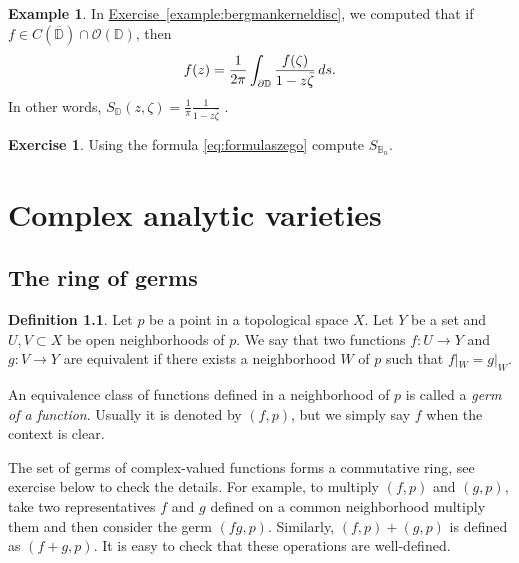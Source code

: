 \documentclass[12pt,openany]{book}
\newcommand{\avoidbreak}{\postdisplaypenalty=100}
\newcommand{\D}{{\mathbb{D}}}
\newcommand{\bB}{{\mathbb{B}}}
\newcommand{\sO}{{\mathscr{O}}}
\newcommand{\myindex}[1]{#1\index{#1}}
\theoremstyle{plain}
\theoremstyle{remark}
\theoremstyle{definition}
\newtheorem{defn}[thm]{Definition}
\newenvironment{exbox}{%
    \def\FrameCommand{\vrule width 1pt \relax\hspace{10pt}}%
    \MakeFramed {\advance \hsize -\width \FrameRestore}%
}{%
    \endMakeFramed
}
\theoremstyle{exercise}
\newtheorem{exercise}{Exercise}[section]
\theoremstyle{example}
\newtheorem{example}[thm]{Example}
\newcommand{\exerciseref}[1]{\hyperref[#1]{Exercise~\ref*{#1}}}
\begin{document}
\begin{example}
In \exerciseref{example:bergmankerneldisc}, we computed that
if $f \in C(\overline{\D}) \cap \sO(\D)$, then
\begin{equation*}
f(z) = \frac{1}{2\pi} \int_{\partial \D} \frac{f(\zeta)}{1-z\bar{\zeta}} \, ds .
\avoidbreak
\end{equation*}
In other words, $S_{\D}(z,\zeta) = 
\frac{1}{\pi}
\frac{1}{1-z\bar{\zeta}}$ .
\end{example}

\begin{exbox}
\begin{exercise}
Using the formula \eqref{eq:formulaszego} compute $S_{\bB_n}$.
\end{exercise}
\end{exbox}


\chapter{Complex analytic varieties} \label{ch:analyticvarieties}


\section{The ring of germs}

\begin{defn}
Let $p$ be a point in a topological space $X$.  Let $Y$ be a set and
$U, V \subset X$ be open neighborhoods of $p$.  We say that
two functions $f \colon U \to Y$ and
$g \colon V \to Y$ are equivalent if there exists a neighborhood
$W$ of $p$ such that $f|_W = g|_W$.

An equivalence class of functions defined in a neighborhood of $p$
is called a \emph{\myindex{germ of a function}}.
%
Usually it is denoted by $(f,p)$, but we simply say $f$ when
the context is clear.
\end{defn}

The set of germs of complex-valued functions forms a
commutative ring, see exercise below to check the details.
For example, to multiply $(f,p)$ and $(g,p)$, take two representatives
$f$ and $g$ defined on a common neighborhood multiply them and
then consider the germ $(fg,p)$.  Similarly, $(f,p) + (g,p)$ is
defined as $(f+g,p)$.  It is easy to check that these operations are
well-defined.
\end{document}
